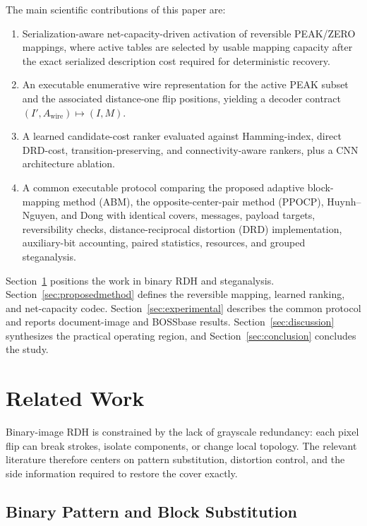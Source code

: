 \documentclass[a4paper,fleqn]{cas-dc}
\begin{document}
The main scientific contributions of this paper are:
\begin{enumerate}
    \item Serialization-aware net-capacity-driven activation of reversible
    PEAK/ZERO mappings, where active tables are selected by usable mapping capacity
    after the exact serialized description cost required for deterministic
    recovery.
    \item An executable enumerative wire representation for the active PEAK
    subset and the associated distance-one flip positions, yielding a decoder
    contract $(I',A_{\mathrm{wire}})\mapsto(I,M)$.
    \item A learned candidate-cost ranker evaluated against Hamming-index,
    direct DRD-cost, transition-preserving, and connectivity-aware rankers, plus
    a CNN architecture ablation.
    \item A common executable protocol comparing the proposed adaptive
    block-mapping method (ABM), the opposite-center-pair method (PPOCP),
    Huynh--Nguyen, and Dong with identical
    covers, messages, payload targets, reversibility checks,
    distance-reciprocal distortion (DRD) implementation, auxiliary-bit
    accounting, paired statistics, resources, and grouped steganalysis.
\end{enumerate}

Section~\ref{sec:relatedwork} positions the work in binary RDH and
steganalysis. Section~\ref{sec:proposedmethod} defines the reversible mapping,
learned ranking, and net-capacity codec. Section~\ref{sec:experimental}
describes the common protocol and reports document-image and BOSSbase results.
Section~\ref{sec:discussion} synthesizes the practical operating region, and
Section~\ref{sec:conclusion} concludes the study.


\section{Related Work}
\label{sec:relatedwork}

Binary-image RDH is constrained by the lack of grayscale redundancy: each
pixel flip can break strokes, isolate components, or change local topology.
The relevant literature therefore centers on pattern substitution, distortion
control, and the side information required to restore the cover exactly.

\subsection{Binary Pattern and Block Substitution}
\end{document}
